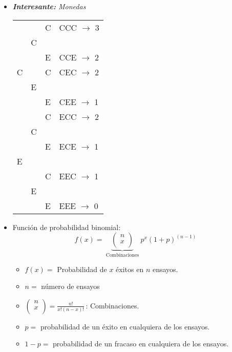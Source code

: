 \begin{itemize}
    \item \emph{\textbf{Interesante:} Monedas }
        \begin{center}
           \begin{tabular}{ | p{5cm} | p{5cm} | p{5cm} | p{5cm} | }
               &   & C & CCC $\rightarrow$ 3\\
               & C &   & \\
               &   & E & CCE $\rightarrow$ 2\\
            C  &   & C & CEC $\rightarrow$ 2\\
               & E &   & \\
               &   & E & CEE $\rightarrow$ 1\\
               &   & C & ECC $\rightarrow$ 2 \\
               & C &   & \\
               &   & E & ECE $\rightarrow$ 1 \\
            E  &   &   &  \\
               &   & C & EEC $\rightarrow$ 1\\
               & E &   & \\
               &   & E & EEE $\rightarrow$ 0\\
        \end{tabular}
        \end{center}
    
    \item Función de probabilidad binomial:
        \[
          f(x) = \underbrace{\left(\begin{matrix}
            n \\ 
            x \\ 
        \end{matrix}\right)}_{\text{  Combinaciones  }} p^x(1+p)^{(n-1)}
        \]
        \begin{itemize}
            \item $f(x)=$ Probabilidad de $x$ éxitos en $n$ ensayos.
            \item $n= $ número de ensayos
            \item $\left(\begin{matrix}
                n \\ x \\ 
            \end{matrix}\right)= \frac{n!}{x!(n-x)!}\,  $:  Combinaciones.
            
            \item $p =$ probabilidad de un éxito en cualquiera de los ensayos.
            \item $1-p=$ probabilidad de un fracaso en cualquiera de los ensayos. 
        \end{itemize}
    

\end{itemize}

